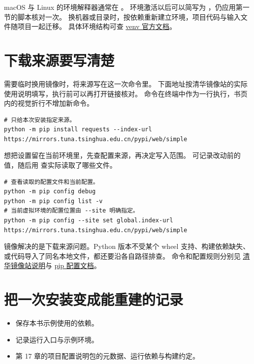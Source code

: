 macOS 与 Linux 的环境解释器通常在 。
环境激活以后可以简写为 ，仍应用第一节的脚本核对一次。
换机器或目录时，按依赖重新建立环境，项目代码与输入文件随项目一起迁移。
具体环境结构可查
\href{https://docs.python.org/3/library/venv.html}{venv 官方文档}。

\section{下载来源要写清楚}

需要临时换用镜像时，将来源写在这一次命令里。
下面地址按清华镜像站的实际使用说明填写，执行前可以再打开链接核对。
命令在终端中作为一行执行，书页内的视觉折行不增加新命令。
\begin{lstlisting}[language={},title={\texttt{terminal}}]
# 只给本次安装指定来源。
python -m pip install requests --index-url https://mirrors.tuna.tsinghua.edu.cn/pypi/web/simple
\end{lstlisting}

想把设置留在当前环境里，先查配置来源，再决定写入范围。
可记录改动前的值，随后用  查实际读取了哪些文件。
\begin{lstlisting}[language={},title={\texttt{terminal}}]
# 查看读取的配置文件和当前配置。
python -m pip config debug
python -m pip config list -v
# 当前虚拟环境的配置位置由 --site 明确指定。
python -m pip config --site set global.index-url https://mirrors.tuna.tsinghua.edu.cn/pypi/web/simple
\end{lstlisting}

镜像解决的是下载来源问题。Python 版本不受某个 wheel 支持、构建依赖缺失、
或代码导入了同名本地文件，都还要沿各自路径排查。
命令和配置规则分别见
\href{https://mirrors.tuna.tsinghua.edu.cn/help/pypi/}{清华镜像站说明}与
\href{https://pip.pypa.io/en/stable/topics/configuration/}{pip 配置文档}。

\section{把一次安装变成能重建的记录}

\begin{itemize}
  \item {} 保存本书示例使用的依赖。
  \item {} 记录运行入口与示例环境。
  \item 第 17 章的项目配置说明包的元数据、运行依赖与构建约定。
\end{itemize}

